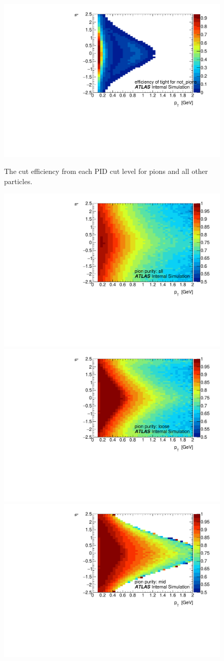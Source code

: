\begin{figure}[t]
\begin{minipage}[t]{1.0\textwidth}
\includegraphics[width=.49\linewidth]{pid_eff_tight_not_pions.pdf}\\
\end{minipage}
\caption{The cut efficiency from each PID cut level for pions and all other particles.}
\label{fig:pid_eff_2d}
\end{figure}


\begin{figure}[t]
\begin{minipage}[t]{1.0\textwidth}
\centering
\includegraphics[width=.49\linewidth]{pid_pur_all.pdf}
\includegraphics[width=.49\linewidth]{pid_pur_loose.pdf}\\
\includegraphics[width=.49\linewidth]{pid_pur_mid.pdf}

\end{minipage}
\end{figure}
